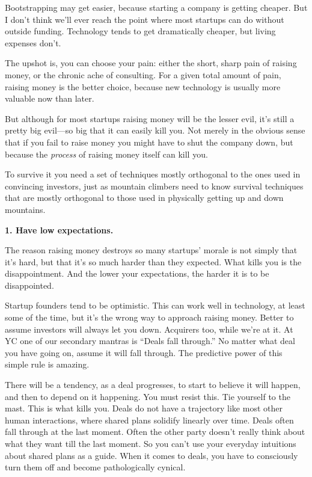 \documentclass[12pt]{book}
\begin{document}
Bootstrapping may get easier, because starting a company is getting
cheaper. But I don't think we'll ever reach the point where most
startups can do without outside funding. Technology tends to get
dramatically cheaper, but living expenses don't.

The upshot is, you can choose your pain: either the short, sharp pain of
raising money, or the chronic ache of consulting. For a given total
amount of pain, raising money is the better choice, because new
technology is usually more valuable now than later.

But although for most startups raising money will be the lesser evil,
it's still a pretty big evil---so big that it can easily kill you. Not
merely in the obvious sense that if you fail to raise money you might
have to shut the company down, but because the \emph{process} of raising
money itself can kill you.

To survive it you need a set of techniques mostly orthogonal to the ones
used in convincing investors, just as mountain climbers need to know
survival techniques that are mostly orthogonal to those used in
physically getting up and down mountains.

\textbf{1. Have low expectations.}

The reason raising money destroys so many startups' morale is not simply
that it's hard, but that it's so much harder than they expected. What
kills you is the disappointment. And the lower your expectations, the
harder it is to be disappointed.

Startup founders tend to be optimistic. This can work well in
technology, at least some of the time, but it's the wrong way to
approach raising money. Better to assume investors will always let you
down. Acquirers too, while we're at it. At YC one of our secondary
mantras is ``Deals fall through.'' No matter what deal you have going
on, assume it will fall through. The predictive power of this simple
rule is amazing.

There will be a tendency, as a deal progresses, to start to believe it
will happen, and then to depend on it happening. You must resist this.
Tie yourself to the mast. This is what kills you. Deals do not have a
trajectory like most other human interactions, where shared plans
solidify linearly over time. Deals often fall through at the last
moment. Often the other party doesn't really think about what they want
till the last moment. So you can't use your everyday intuitions about
shared plans as a guide. When it comes to deals, you have to consciously
turn them off and become pathologically cynical.
\end{document}
